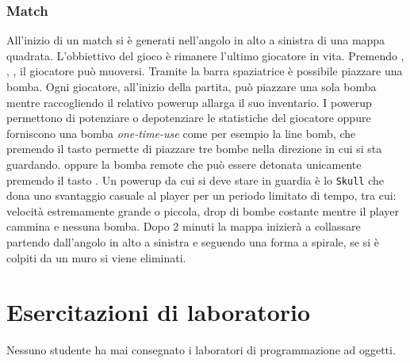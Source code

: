 \documentclass[a4paper,12pt]{report}
\begin{document}
\subsection{Match}
All'inizio di un match si è generati nell'angolo in alto a sinistra di una mappa quadrata. L'obbiettivo del gioco è rimanere l'ultimo giocatore in vita. 
Premendo , , ,  il giocatore può muoversi.
Tramite la barra spaziatrice  è possibile piazzare una bomba.
Ogni giocatore, all'inizio della partita, può piazzare una sola bomba mentre raccogliendo il relativo powerup allarga il suo inventario.
\newline
I powerup permettono di potenziare o depotenziare le statistiche del giocatore oppure forniscono una bomba \textit{one-time-use} come per esempio la line bomb, che premendo il tasto  permette di piazzare tre bombe nella direzione in cui si sta guardando.
oppure la bomba remote che può essere detonata unicamente premendo il tasto .
\newline
Un powerup da cui si deve stare in guardia è lo \texttt{Skull} che dona uno svantaggio casuale al player per un periodo limitato di tempo, tra cui: velocità estremamente grande o piccola, drop di bombe costante mentre il player cammina e nessuna bomba. 
\newline
Dopo 2 minuti la mappa inizierà a collassare partendo dall'angolo in alto a sinistra e seguendo una forma a spirale, se si è colpiti da un muro si viene eliminati.

\chapter{Esercitazioni di laboratorio} 
Nessuno studente ha mai consegnato i laboratori di programmazione ad oggetti. 
\end{document}
